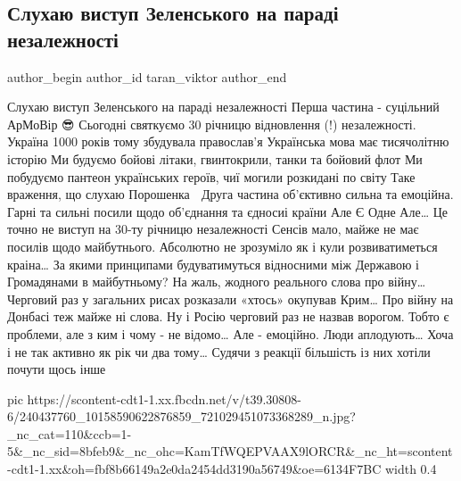  
 
 
 
 
 
\subsection{Слухаю виступ Зеленського на параді незалежності}
\label{sec:24_08_2021.fb.taran_viktor.1.zelenskii_parad_nezalezhnist}
 
\ifcmt
 author_begin
   author_id taran_viktor
 author_end
\fi

\obeycr
Слухаю виступ Зеленського на параді незалежності 
Перша частина - суцільний АрМоВір 😎
Сьогодні святкуємо 30 річницю відновлення (!) незалежності.
Україна 1000 років тому збудувала православ’я
Українська мова має тисячолітню історію
Ми будуємо бойові літаки, гвинтокрили, танки та бойовий флот
Ми побудуємо пантеон українських героїв, чиї могили розкидані по світу 
Таке враження, що слухаю Порошенка 🙂
Друга частина об’єктивно сильна та емоційна.
Гарні та сильні посили щодо об’єднання та єдносиі країни 
Але Є Одне Але…
Це точно не виступ на 30-ту річницю незалежності
Сенсів мало, майже не має посилів щодо майбутнього. Абсолютно не зрозуміло як і кули розвиватиметься краіна…
За якими принципами будуватимуться відносними між Державою і Громадянами в майбутньому?
На жаль, жодного реального слова про війну…
Черговий раз у загальних рисах розказали «хтось» окупував Крим… Про війну на Донбасі теж майже ні слова.
Ну і Росію черговий раз не назвав ворогом.
Тобто є проблеми, але з ким і чому - не відомо…
Але - емоційно. Люди аплодують… Хоча і не так активно як рік чи два тому…
Судячи з реакції більшість із них хотіли почути щось інше
\restorecr

\ifcmt
  pic https://scontent-cdt1-1.xx.fbcdn.net/v/t39.30808-6/240437760_10158590622876859_721029451073368289_n.jpg?_nc_cat=110&ccb=1-5&_nc_sid=8bfeb9&_nc_ohc=KamTfWQEPVAAX9lORCR&_nc_ht=scontent-cdt1-1.xx&oh=fbf8b66149a2e0da2454dd3190a56749&oe=6134F7BC
  width 0.4
\fi

